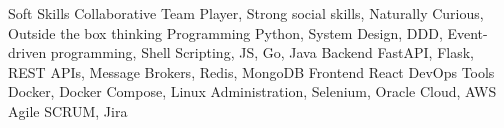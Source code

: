 
\begin{cvskills}

    \cvskill
    {Soft Skills}
    {Collaborative Team Player, Strong social skills, Naturally Curious, Outside the box thinking}
    \cvskill
    {Programming}
    {Python, System Design, DDD, Event-driven programming, Shell Scripting, JS, Go, Java}
    \cvskill
    {Backend}
    {FastAPI, Flask, REST APIs, Message Brokers, Redis, MongoDB}
    \cvskill
    {Frontend}
    {React}
    \cvskill
    {DevOps Tools}
    {Docker, Docker Compose, Linux Administration, Selenium, Oracle Cloud, AWS}
    \cvskill
    {Agile}
    {SCRUM, Jira}
\end{cvskills}